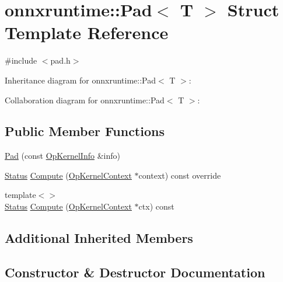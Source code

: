 \hypertarget{structonnxruntime_1_1Pad}{}\section{onnxruntime\+:\+:Pad$<$ T $>$ Struct Template Reference}
\label{structonnxruntime_1_1Pad}


{\ttfamily \#include $<$pad.\+h$>$}



Inheritance diagram for onnxruntime\+:\+:Pad$<$ T $>$\+:


Collaboration diagram for onnxruntime\+:\+:Pad$<$ T $>$\+:
\subsection*{Public Member Functions}
\begin{DoxyCompactItemize}
\item 
\mbox{\hyperlink{structonnxruntime_1_1Pad_a5aae3b3bb4feb82902c9261c4f84b0d1}{Pad}} (const \mbox{\hyperlink{classonnxruntime_1_1OpKernelInfo}{Op\+Kernel\+Info}} \&info)
\item 
\mbox{\hyperlink{classonnxruntime_1_1common_1_1Status}{Status}} \mbox{\hyperlink{structonnxruntime_1_1Pad_a5a49d7367e5fb1ae2e2e280ae57ec2fd}{Compute}} (\mbox{\hyperlink{classonnxruntime_1_1OpKernelContext}{Op\+Kernel\+Context}} $\ast$context) const override
\item 
{\footnotesize template$<$$>$ }\\\mbox{\hyperlink{classonnxruntime_1_1common_1_1Status}{Status}} \mbox{\hyperlink{structonnxruntime_1_1Pad_aafeb5b72f8eda3583bb4698c61a568e0}{Compute}} (\mbox{\hyperlink{classonnxruntime_1_1OpKernelContext}{Op\+Kernel\+Context}} $\ast$ctx) const
\end{DoxyCompactItemize}
\subsection*{Additional Inherited Members}


\subsection{Constructor \& Destructor Documentation}
\mbox{\label{structonnxruntime_1_1Pad_a5aae3b3bb4feb82902c9261c4f84b0d1}} 

